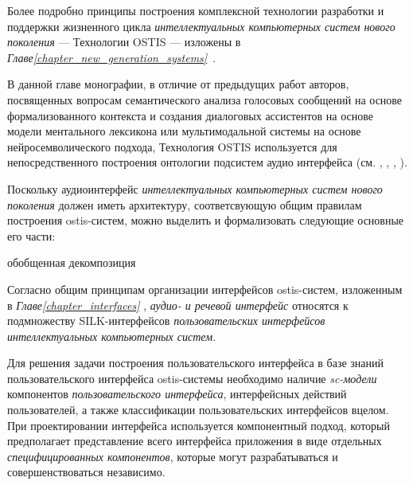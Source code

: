 Более подробно принципы построения комплексной технологии разработки и поддержки жизненного цикла \textit{интеллектуальных компьютерных систем нового поколения} — Технологии OSTIS — изложены в \textit{Главе\ref{chapter_new_generation_systems}~}.

В данной главе монографии, в отличие от предыдущих работ авторов, посвященных вопросам семантического анализа голосовых сообщений на основе формализованного контекста и создания диалоговых ассистентов на основе модели ментального лексикона или мультимодальной системы на основе нейросемволического подхода, Технология OSTIS используется для непосредственного построения онтологии подсистем аудио интерфейса (см. , , , ).

Поскольку аудиоинтерфейс \textit{интеллектуальных компьютерных систем нового поколения} должен иметь архитектуру, соответсвующую общим правилам построения ostis-систем, можно выделить и формализовать следующие основные его части: 
\begin{SCn}
	\begin{scnrelfromset}{обобщенная декомпозиция}
	\end{scnrelfromset}
\end{SCn}

Согласно общим принципам организации интерфейсов ostis-систем, изложенным в  \textit{Главе\ref{chapter_interfaces} }, \textit{аудио- и речевой интерфейс} относятся к подмножеству SILK-интерфейсов \textit{пользовательских интерфейсов} \textit{интеллектуальных компьютерных систем}. 

Для решения задачи построения пользовательского интерфейса в базе знаний
пользовательского интерфейса ostis-системы необходимо наличие \textit{sc-модели} компонентов \textit{пользовательского интерфейса}, интерфейсных действий пользователей, а также классификации пользовательских интерфейсов
вцелом. При проектировании интерфейса используется компонентный подход, который предполагает представление всего интерфейса приложения в виде отдельных \textit{специфицированных компонентов}, которые могут разрабатываться и совершенствоваться независимо.

